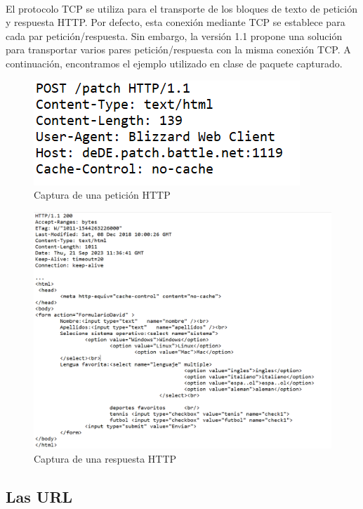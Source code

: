 \documentclass{article}
\begin{document}
	\paragraph{}El protocolo TCP se utiliza para el transporte de los bloques de texto de petición y respuesta HTTP. Por defecto, esta conexión mediante TCP se establece para cada par petición/respuesta. Sin embargo, la versión 1.1 propone una solución para transportar varios pares petición/respuesta con la misma conexión TCP. A continuación, encontramos el ejemplo utilizado en clase de paquete capturado.
	
	\begin{figure}[H]
		\centering
		\includegraphics[scale=0.5]{images/peticionhttp.PNG}
		\caption{\label{fig1}Captura de una petición HTTP}
	\end{figure}
	
	\begin{figure}[H]
		\centering
		\includegraphics[scale=0.5]{images/respuestahttp.png}
		\caption{\label{fig2}Captura de una respuesta HTTP}
	\end{figure}
	
	\subsection{Las URL}
	
\end{document}
